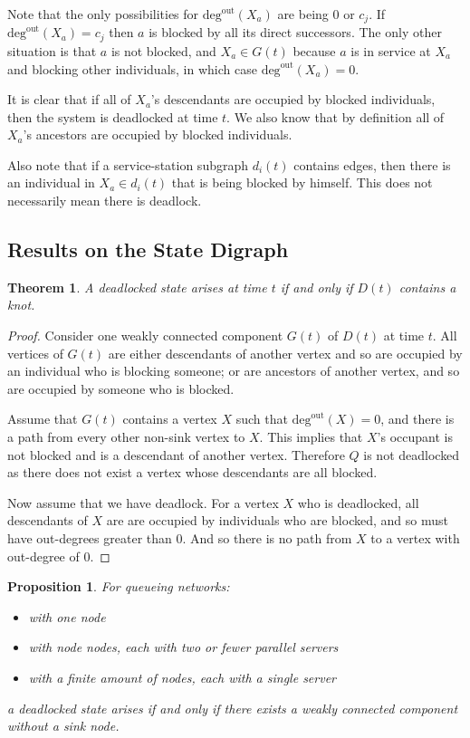 \documentclass{article}
\newtheorem{theorem}{Theorem}
\newtheorem{proposition}{Proposition}
\begin{document}
Note that the only possibilities for $\text{deg}^{\text{out}}(X_a)$ are being 0 or $c_j$.
If $\text{deg}^{\text{out}}(X_a) = c_j$ then $a$ is blocked by all its direct successors.
The only other situation is that $a$ is not blocked, and $X_a \in G(t)$ because $a$ is in service at $X_a$ and blocking other individuals, in which case $\text{deg}^{\text{out}}(X_a) = 0$.

It is clear that if all of $X_a$'s descendants are occupied by blocked individuals, then the system is deadlocked at time $t$.
We also know that by definition all of $X_a$'s ancestors are occupied by blocked individuals.

Also note that if a service-station subgraph $d_i(t)$ contains edges, then there is an individual in $X_a \in d_i(t)$ that is being blocked by himself.
This does not necessarily mean there is deadlock.


\subsection{Results on the State Digraph}

\begin{theorem}
A deadlocked state arises at time $t$ if and only if $D(t)$ contains a knot.
\end{theorem}

\begin{proof}
Consider one weakly connected component $G(t)$ of $D(t)$ at time $t$.
All vertices of $G(t)$ are either descendants of another vertex and so are occupied by an individual who is blocking someone; or are ancestors of another vertex, and so are occupied by someone who is blocked.

Assume that $G(t)$ contains a vertex $X$ such that $\text{deg}^{\text{out}}(X) = 0$, and there is a path from every other non-sink vertex to $X$.
This implies that $X$'s occupant is not blocked and is a descendant of another vertex.
Therefore $Q$ is not deadlocked as there does not exist a vertex whose descendants are all blocked.

Now assume that we have deadlock.
For a vertex $X$ who is deadlocked, all descendants of $X$ are are occupied by individuals who are blocked, and so must have out-degrees greater than 0.
And so there is no path from $X$ to a vertex with out-degree of 0.

\end{proof}


\begin{proposition}
For queueing networks:
\begin{itemize}
  \item with one node
  \item with node nodes, each with two or fewer parallel servers
  \item with a finite amount of nodes, each with a single server
\end{itemize}
a deadlocked state arises if and only if there exists a weakly connected component without a sink node.
\end{proposition}
\end{document}
